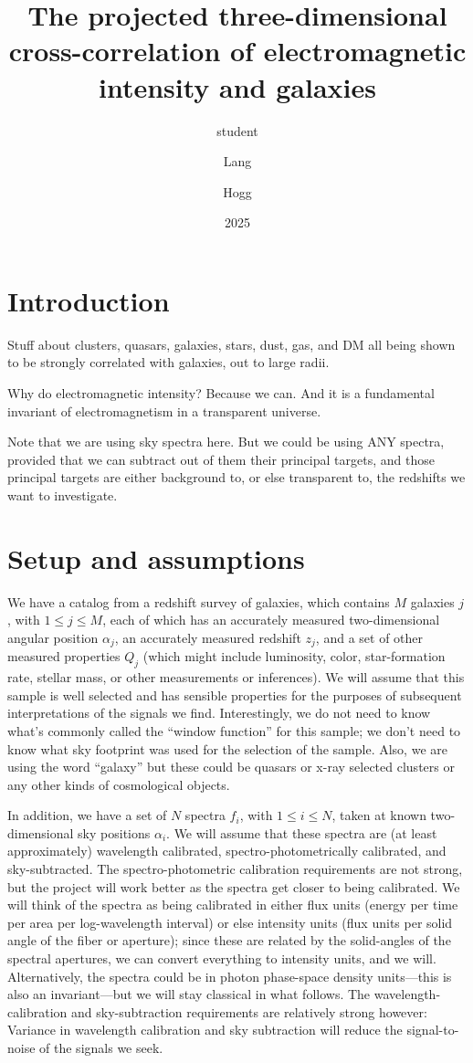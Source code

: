 \documentclass{article}
\title{\bfseries%
The projected three-dimensional cross-correlation of electromagnetic intensity and galaxies}
\author{student \and Lang \and Hogg}
\date{2025}
\begin{document}
\maketitle

\section{Introduction}
Stuff about clusters, quasars, galaxies, stars, dust, gas, and DM all being shown to be strongly correlated with galaxies, out to large radii.

Why do electromagnetic intensity? Because we can. And it is a fundamental invariant of electromagnetism in a transparent universe.

Note that we are using sky spectra here. But we could be using ANY spectra, provided that we can subtract out of them their principal targets, and those principal targets are either background to, or else transparent to, the redshifts we want to investigate.

\section{Setup and assumptions}
We have a catalog from a redshift survey of galaxies, which contains $M$ galaxies $j$, with $1\leq j\leq M$, each of which has an accurately measured two-dimensional angular position $\alpha_j$, an accurately measured redshift $z_j$, and a set of other measured properties $Q_j$ (which might include luminosity, color, star-formation rate, stellar mass, or other measurements or inferences).
We will assume that this sample is well selected and has sensible properties for the purposes of subsequent interpretations of the signals we find.
Interestingly, we do not need to know what's commonly called the ``window function'' for this sample; we don't need to know what sky footprint was used for the selection of the sample.
Also, we are using the word ``galaxy'' but these could be quasars or x-ray selected clusters or any other kinds of cosmological objects.

In addition, we have a set of $N$ spectra $f_i$, with $1\leq i\leq N$, taken at known two-dimensional sky positions $\alpha_i$.
We will assume that these spectra are (at least approximately) wavelength calibrated, spectro-photometrically calibrated, and sky-subtracted.
The spectro-photometric calibration requirements are not strong, but the project will work better as the spectra get closer to being calibrated.
We will think of the spectra as being calibrated in either flux units (energy per time per area per log-wavelength interval) or else intensity units (flux units per solid angle of the fiber or aperture); since these are related by the solid-angles of the spectral apertures, we can convert everything to intensity units, and we will.
Alternatively, the spectra could be in photon phase-space density units---this is also an invariant---but we will stay classical in what follows.
The wavelength-calibration and sky-subtraction requirements are relatively strong however:
Variance in wavelength calibration and sky subtraction will reduce the signal-to-noise of the signals we seek.
\end{document}
